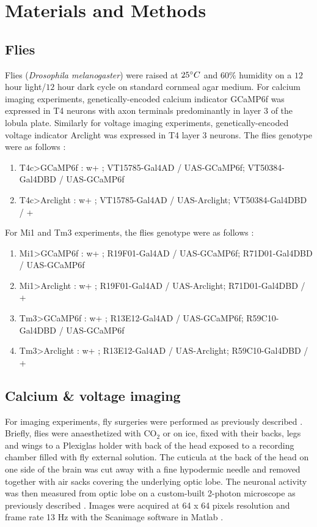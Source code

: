 \documentclass[9pt,lineno]{elife}
\begin{document}
\section{Materials and Methods}
\subsection{Flies}
Flies (\textit{Drosophila melanogaster}) were raised at $25\degree C$ and $60\%$ humidity on a $12$ hour light/$12$ hour dark cycle on standard cornmeal agar medium. For calcium imaging experiments, genetically-encoded calcium indicator GCaMP6f \parencite{Chen2013} was expressed in T4 neurons with axon terminals predominantly in  layer 3 of the lobula plate. Similarly for voltage imaging experiments, genetically-encoded voltage indicator Arclight \parencite{Jin2012} was expressed in T4 layer 3 neurons. The flies genotype were as follows : 
\begin{enumerate}
\item T4c>GCaMP6f :	w+ ; VT15785-Gal4AD / UAS-GCaMP6f; VT50384-Gal4DBD / UAS-GCaMP6f 
\item T4c>Arclight :	w+ ; VT15785-Gal4AD / UAS-Arclight; VT50384-Gal4DBD / + 
\end{enumerate}

For Mi1 and Tm3 experiments, the flies genotype were as follows :
\begin{enumerate}
\item Mi1>GCaMP6f :		w+ ; R19F01-Gal4AD / UAS-GCaMP6f; R71D01-Gal4DBD / UAS-GCaMP6f 
\item Mi1>Arclight :		w+ ; R19F01-Gal4AD / UAS-Arclight; R71D01-Gal4DBD / +
\item Tm3>GCaMP6f :		w+ ; R13E12-Gal4AD / UAS-GCaMP6f; R59C10-Gal4DBD / UAS-GCaMP6f 
\item Tm3>Arclight :		w+ ; R13E12-Gal4AD / UAS-Arclight; R59C10-Gal4DBD / +

\end{enumerate}

\subsection{Calcium \& voltage imaging}
For imaging experiments, fly surgeries were performed as previously described \parencite{Maisak2013}. Briefly, flies were anaesthetized with CO$_2$ or on ice, fixed with their backs, legs and wings to a Plexiglas holder with back of the head exposed to a recording chamber filled with fly external solution. The cuticula at the back of the head on one side of the brain was cut away with a fine hypodermic needle and removed together with air sacks covering the underlying optic lobe. The neuronal activity was then measured from optic lobe on a custom-built 2-photon microscope as previously described \parencite{Maisak2013}. Images were acquired at 64 x 64 pixels resolution and frame rate 13 Hz with the Scanimage software in Matlab  \parencite{Pologruto2003}.
\end{document}
